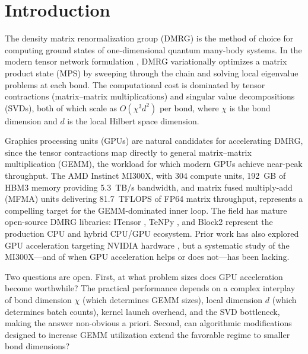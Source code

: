 \documentclass[preprint,12pt]{elsarticle}
\begin{document}
\section{Introduction}
\label{sec:intro}

The density matrix renormalization group (DMRG) \cite{White1992,White1993,Schollwoeck2005} is the method of choice for computing ground states of one-dimensional quantum many-body systems.
In the modern tensor network formulation \cite{Schollwoeck2011,Orus2014}, DMRG variationally optimizes a matrix product state (MPS) by sweeping through the chain and solving local eigenvalue problems at each bond.
The computational cost is dominated by tensor contractions (matrix--matrix multiplications) and singular value decompositions (SVDs), both of which scale as $O(\chi^3 d^2)$ per bond, where $\chi$ is the bond dimension and $d$ is the local Hilbert space dimension.

Graphics processing units (GPUs) are natural candidates for accelerating DMRG, since the tensor contractions map directly to general matrix--matrix multiplication (GEMM), the workload for which modern GPUs achieve near-peak throughput.
The AMD Instinct MI300X, with 304 compute units, 192~GB of HBM3 memory providing 5.3~TB/s bandwidth, and matrix fused multiply-add (MFMA) units delivering 81.7~TFLOPS of FP64 matrix throughput, represents a compelling target for the GEMM-dominated inner loop.
The field has mature open-source DMRG libraries: ITensor \cite{Fishman2022}, TeNPy \cite{HauschildPollmann2018}, and Block2 \cite{Zhai2021} represent the production CPU and hybrid CPU/GPU ecosystem.
Prior work has also explored GPU acceleration targeting NVIDIA hardware \cite{Nemes2014,Ganahl2023}, but a systematic study of the MI300X---and of when GPU acceleration helps or does not---has been lacking.

Two questions are open.
First, at what problem sizes does GPU acceleration become worthwhile?
The practical performance depends on a complex interplay of bond dimension $\chi$ (which determines GEMM sizes), local dimension $d$ (which determines batch counts), kernel launch overhead, and the SVD bottleneck, making the answer non-obvious a priori.
Second, can algorithmic modifications designed to increase GEMM utilization extend the favorable regime to smaller bond dimensions?
\end{document}
